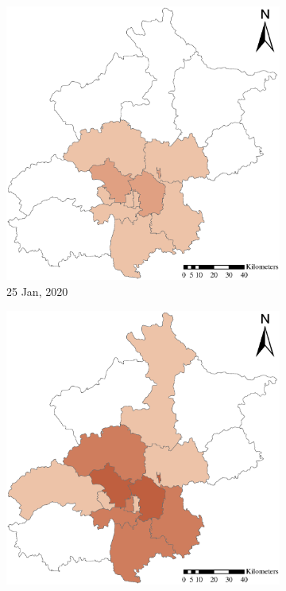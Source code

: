 \documentclass[preprints,ijgi,submit,moreauthors]{Definitions/mdpi}
\begin{document}
\begin{figure}[ht]
    \centering
    \begin{subfigure}{.23\textwidth}
        \includegraphics[width=\textwidth]{Figures/ConfirmedDistrictD2020_01_25.eps}
        \caption{25 Jan, 2020}
    \end{subfigure}
    \begin{subfigure}{.23\textwidth}
        \includegraphics[width=\textwidth]{Figures/ConfirmedDistrictD2020_01_30.eps}

\end{subfigure}
\end{figure}
\end{document}
